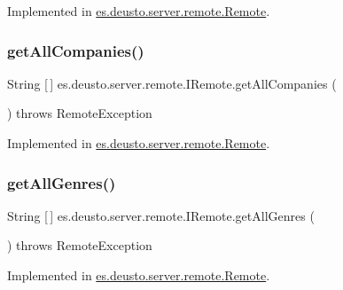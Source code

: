 Implemented in \hyperlink{classes_1_1deusto_1_1server_1_1remote_1_1_remote_ad9f8ad426b1162504b7b39eb1c86d2a3}{es.\+deusto.\+server.\+remote.\+Remote}.

\mbox{\label{interfacees_1_1deusto_1_1server_1_1remote_1_1_i_remote_a43ab8347d64e5d49093e607029f2598b}} 
\subsubsection{\texorpdfstring{get\+All\+Companies()}{getAllCompanies()}}
{\footnotesize\ttfamily String \mbox{[}$\,$\mbox{]} es.\+deusto.\+server.\+remote.\+I\+Remote.\+get\+All\+Companies (\begin{DoxyParamCaption}{ }\end{DoxyParamCaption}) throws Remote\+Exception}



Implemented in \hyperlink{classes_1_1deusto_1_1server_1_1remote_1_1_remote_ab8595d6689604ef57f2d01309936ccd2}{es.\+deusto.\+server.\+remote.\+Remote}.

\mbox{\label{interfacees_1_1deusto_1_1server_1_1remote_1_1_i_remote_a7c3721ee532d20aa65b892b55f157b21}} 
\subsubsection{\texorpdfstring{get\+All\+Genres()}{getAllGenres()}}
{\footnotesize\ttfamily String \mbox{[}$\,$\mbox{]} es.\+deusto.\+server.\+remote.\+I\+Remote.\+get\+All\+Genres (\begin{DoxyParamCaption}{ }\end{DoxyParamCaption}) throws Remote\+Exception}



Implemented in \hyperlink{classes_1_1deusto_1_1server_1_1remote_1_1_remote_a89ce5459e2ebe375dc534e59eda91b74}{es.\+deusto.\+server.\+remote.\+Remote}.

